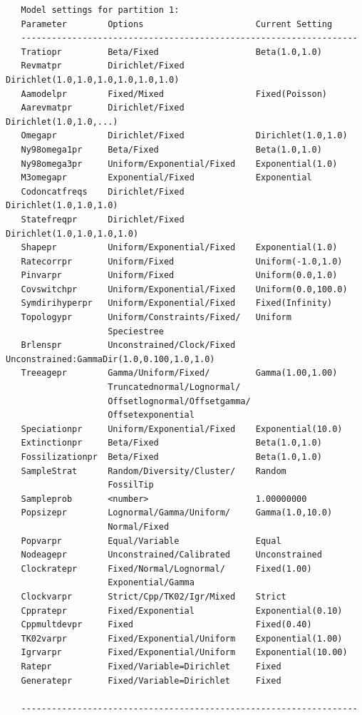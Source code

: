 \documentclass[12pt]{book}
\begin{document}
\begin{singlespacing}
\small
\begin{verbatim}
   Model settings for partition 1:
   Parameter        Options                      Current Setting
   ------------------------------------------------------------------
   Tratiopr         Beta/Fixed                   Beta(1.0,1.0)
   Revmatpr         Dirichlet/Fixed              Dirichlet(1.0,1.0,1.0,1.0,1.0,1.0)
   Aamodelpr        Fixed/Mixed                  Fixed(Poisson)
   Aarevmatpr       Dirichlet/Fixed              Dirichlet(1.0,1.0,...)
   Omegapr          Dirichlet/Fixed              Dirichlet(1.0,1.0)
   Ny98omega1pr     Beta/Fixed                   Beta(1.0,1.0)
   Ny98omega3pr     Uniform/Exponential/Fixed    Exponential(1.0)
   M3omegapr        Exponential/Fixed            Exponential
   Codoncatfreqs    Dirichlet/Fixed              Dirichlet(1.0,1.0,1.0)
   Statefreqpr      Dirichlet/Fixed              Dirichlet(1.0,1.0,1.0,1.0)
   Shapepr          Uniform/Exponential/Fixed    Exponential(1.0)
   Ratecorrpr       Uniform/Fixed                Uniform(-1.0,1.0)
   Pinvarpr         Uniform/Fixed                Uniform(0.0,1.0)
   Covswitchpr      Uniform/Exponential/Fixed    Uniform(0.0,100.0)
   Symdirihyperpr   Uniform/Exponential/Fixed    Fixed(Infinity)
   Topologypr       Uniform/Constraints/Fixed/   Uniform
                    Speciestree
   Brlenspr         Unconstrained/Clock/Fixed    Unconstrained:GammaDir(1.0,0.100,1.0,1.0)
   Treeagepr        Gamma/Uniform/Fixed/         Gamma(1.00,1.00)
                    Truncatednormal/Lognormal/
                    Offsetlognormal/Offsetgamma/
                    Offsetexponential
   Speciationpr     Uniform/Exponential/Fixed    Exponential(10.0)
   Extinctionpr     Beta/Fixed                   Beta(1.0,1.0)
   Fossilizationpr  Beta/Fixed                   Beta(1.0,1.0)
   SampleStrat      Random/Diversity/Cluster/    Random
                    FossilTip
   Sampleprob       <number>                     1.00000000
   Popsizepr        Lognormal/Gamma/Uniform/     Gamma(1.0,10.0)
                    Normal/Fixed
   Popvarpr         Equal/Variable               Equal
   Nodeagepr        Unconstrained/Calibrated     Unconstrained
   Clockratepr      Fixed/Normal/Lognormal/      Fixed(1.00)
                    Exponential/Gamma
   Clockvarpr       Strict/Cpp/TK02/Igr/Mixed    Strict
   Cppratepr        Fixed/Exponential            Exponential(0.10)
   Cppmultdevpr     Fixed                        Fixed(0.40)
   TK02varpr        Fixed/Exponential/Uniform    Exponential(1.00)
   Igrvarpr         Fixed/Exponential/Uniform    Exponential(10.00)
   Ratepr           Fixed/Variable=Dirichlet     Fixed
   Generatepr       Fixed/Variable=Dirichlet     Fixed

   ------------------------------------------------------------------
\end{verbatim}
\normalsize
\end{singlespacing}
\end{document}
